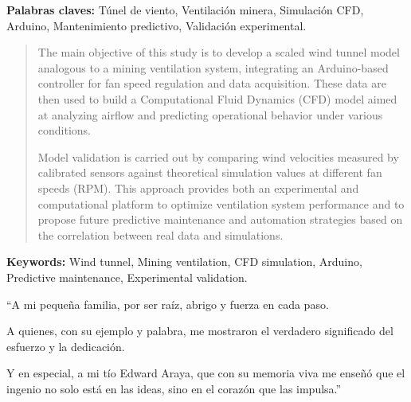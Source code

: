 \documentclass{auxiliares/umemoria}
\begin{document}
\vfill
\noindent\textbf{Palabras claves: } Túnel de viento, Ventilación minera, Simulación CFD, Arduino, Mantenimiento predictivo, Validación experimental.  %
\begin{abstract}
  The main objective of this study is to develop a scaled wind tunnel model analogous to a mining ventilation system, integrating an Arduino-based controller for fan speed regulation and data acquisition. These data are then used to build a Computational Fluid Dynamics (CFD) model aimed at analyzing airflow and predicting operational behavior under various conditions.

  Model validation is carried out by comparing wind velocities measured by calibrated sensors against theoretical simulation values at different fan speeds (RPM). This approach provides both an experimental and computational platform to optimize ventilation system performance and to propose future predictive maintenance and automation strategies based on the correlation between real data and simulations.\\

\end{abstract}
\vfill
\noindent\textbf{Keywords: } Wind tunnel, Mining ventilation, CFD simulation, Arduino, Predictive maintenance, Experimental validation.


\begin{dedicatoria}
``A mi pequeña familia,
por ser raíz, abrigo y fuerza en cada paso.

A quienes, con su ejemplo y palabra,
me mostraron el verdadero significado del esfuerzo y la dedicación.

Y en especial, a mi tío Edward Araya,
que con su memoria viva me enseñó
que el ingenio no solo está en las ideas,
sino en el corazón que las impulsa.''
\end{dedicatoria}


\begin{thanks}

\end{thanks}
\end{document}
